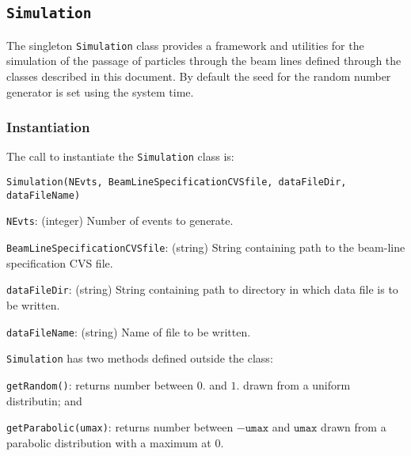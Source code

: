 \FloatBarrier

\subsection{\texttt{Simulation}}
\label{SubSect:Simu}

The singleton \texttt{Simulation} class provides a framework and
utilities for the simulation of the passage of particles through the
beam lines defined through the classes described in this document.
By default the seed for the random number generator is set using the
system time.

\subsubsection{Instantiation}
\noindent
The call to instantiate the \texttt{Simulation} class is:
\begin{center}
  \texttt{Simulation(NEvts, BeamLineSpecificationCVSfile, dataFileDir, dataFileName)}
\end{center}
\begin{description}
  \item{\texttt{NEvts}}: (integer) Number of events to generate.
  \item{\texttt{BeamLineSpecificationCVSfile}}: (string) String
    containing path to the beam-line specification CVS file.
  \item{\texttt{dataFileDir}}: (string) String containing path
    to directory in which data file is to be written.
  \item{\texttt{dataFileName}}: (string) Name of file to be written.
\end{description}

\texttt{Simulation} has two methods defined outside the class:
\begin{description}
  \item{\texttt{getRandom()}}: returns number between $0.$ and $1.$
    drawn from a uniform distributin; and 
  \item{\texttt{getParabolic(umax)}}: returns number between
    $-\texttt{umax}$ and $\texttt{umax}$ drawn from a parabolic
      distribution with a maximum at 0. 
\end{description}
